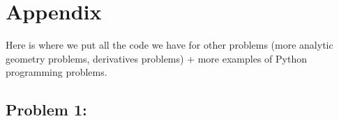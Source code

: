 \section{Appendix} \label{sec:appendix}

Here is where we put all the code we have for other problems (more analytic geometry problems, derivatives problems) + more examples of Python programming problems.

\subsection{Problem 1: }